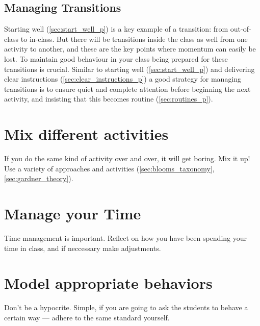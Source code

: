 \documentclass[12pt]{report}
\begin{document}
\subsection{Managing Transitions}
\label{sec:managing_transitions_p}

Starting well (\ref{sec:start_well_p}) is a key example of a transition: from out-of-class to in-class. But there will be transitions inside the class as well from one activity to another, and these are the key points where momentum can easily be lost. To maintain good behaviour in your class being prepared for these transitions is crucial. Similar to starting well (\ref{sec:start_well_p}) and delivering clear instructions (\ref{sec:clear_instructions_p}) a good strategy for managing transitions is to ensure quiet and complete attention before beginning the next activity, and insisting that this becomes routine (\ref{sec:routines_p}). 



\section{Mix different activities}
\label{sec:mix_differnt_activities_p}

If you do the same kind of activity over and over, it will get boring. Mix it up! Use a variety of approaches and activities (\ref{sec:blooms_taxonomy}, \ref{sec:gardner_theory}).



\section{Manage your Time}
\label{sec:manage_your_time_p}

Time management is important. Reflect on how you have been spending your time in class, and if neccessary make adjustments. 



\section{Model appropriate behaviors}
\label{sec:model_behaviours_p}

Don't be a hypocrite. Simple, if you are going to ask the students to behave a certain way --- adhere to the same standard yourself.
\end{document}
